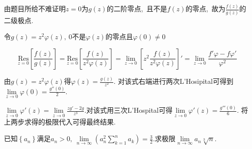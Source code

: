 	\begin{solution}
		由题目所给不难证明$z=0$为$g(z)$的二阶零点,\ 且不是$f(z)$的零点,\ 故为$\frac{f(z)}{g(z)}$的二级极点.
		
		令$g(z)=z^2\varphi(z),\ 0\text{不是}\varphi(z)$的零点且$\varphi(0)\neq0$
		
		$$\underset{z=0}{\text{Res}}\left[\frac{f(z)}{g(z)}\right]=\underset{z=0}{\text{Res}}\left[\frac{f(z)}{z^2\varphi(z)}\right]=\lim\limits_{z\rightarrow 0}\left[z^2\frac{f(z)}{z^2\varphi(z)}\right]'=\lim\limits_{z\rightarrow 0}\frac{f'\varphi-f\varphi'}{\varphi^2}$$
		
		由$g(z)=z^2\varphi(z)$得$\varphi(z)=\frac{g(z)}{z^2}$.
		对该式右端进行两次L'Hosipital可得到$\lim\limits_{z\rightarrow 0}\varphi(0)=\frac{g''(0)}{2}.$
		
		$\lim\limits_{z\rightarrow 0}\varphi'(z)=\lim\limits_{z\rightarrow 0}\frac{zg'-2g}{z^3}$.对该式用三次L'Hospital可得$\lim\limits_{z\rightarrow 0}\varphi'(z)=\frac{g'''(0)}{6}.$
		将上两步求得的极限代入可得最终结果.
	\end{solution}
	\newpage
	\begin{problem}
		已知$\left\{a_n\right\}$满足$a_n>0,\ \lim\limits_{n\rightarrow\infty}\left(a_n^2\sum\limits_{k=1}^{n}a_k\right)=\frac{3}{2}.$求极限$\lim\limits_{n\rightarrow\infty}a_n\sqrt[3]{n}.$
	\end{problem}
	
